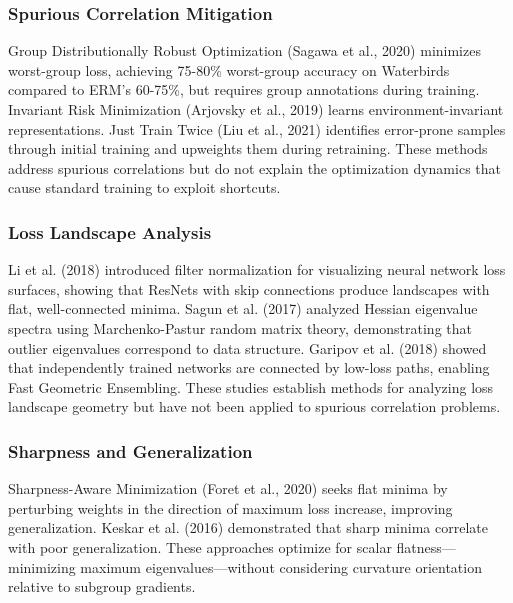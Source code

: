 
\subsubsection{Spurious Correlation Mitigation}

Group Distributionally Robust Optimization (Sagawa et al., 2020) minimizes worst-group loss, achieving 75-80\% worst-group accuracy on Waterbirds compared to ERM's 60-75\%, but requires group annotations during training. Invariant Risk Minimization (Arjovsky et al., 2019) learns environment-invariant representations. Just Train Twice (Liu et al., 2021) identifies error-prone samples through initial training and upweights them during retraining. These methods address spurious correlations but do not explain the optimization dynamics that cause standard training to exploit shortcuts.

\subsubsection{Loss Landscape Analysis}

Li et al. (2018) introduced filter normalization for visualizing neural network loss surfaces, showing that ResNets with skip connections produce landscapes with flat, well-connected minima. Sagun et al. (2017) analyzed Hessian eigenvalue spectra using Marchenko-Pastur random matrix theory, demonstrating that outlier eigenvalues correspond to data structure. Garipov et al. (2018) showed that independently trained networks are connected by low-loss paths, enabling Fast Geometric Ensembling. These studies establish methods for analyzing loss landscape geometry but have not been applied to spurious correlation problems.

\subsubsection{Sharpness and Generalization}

Sharpness-Aware Minimization (Foret et al., 2020) seeks flat minima by perturbing weights in the direction of maximum loss increase, improving generalization. Keskar et al. (2016) demonstrated that sharp minima correlate with poor generalization. These approaches optimize for scalar flatness—minimizing maximum eigenvalues—without considering curvature orientation relative to subgroup gradients.
